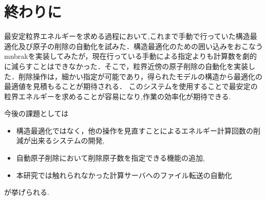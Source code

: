 \chapter{終わりに}\label{ux7d42ux308fux308aux306b}

最安定粒界エネルギーを求める過程において,これまで手動で行っていた構造最適化及び原子の削除の自動化を試みた．構造最適化のための囲い込みをおこなうmnbrakを実装してみたが，現在行っている手動による指定よりも計算数を劇的に減らすことはできなかった．そこで，粒界近傍の原子削除の自動化を実装した．削除操作は，細かい指定が可能であり，得られたモデルの構造から最適化の最適値を見積もることが期待される．
このシステムを使用することで最安定の粒界エネルギーを求めることが容易になり,作業の効率化が期待できる.

今後の課題としては
\begin{itemize}
\item 構造最適化ではなく，他の操作を見直すことによるエネルギー計算回数の削減が出来るシステムの開発,
\item 自動原子削除において削除原子数を指定できる機能の追加,
\item 本研究では触れられなかった計算サーバへのファイル転送の自動化
\end{itemize}
が挙げられる.